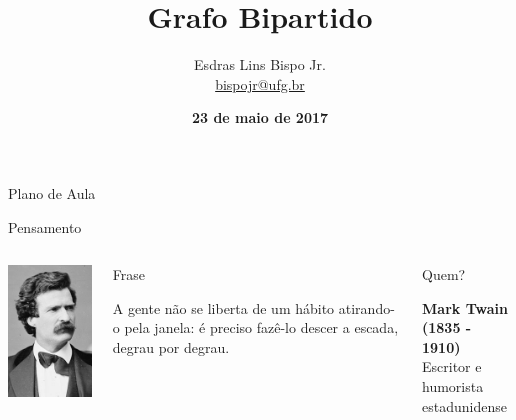 \documentclass[xcolor=dvipsnames,table]{beamer}
\title{Grafo Bipartido}
\author{
  Esdras Lins Bispo Jr. \\ \url{bispojr@ufg.br}
  }
\institute{
  Teoria de Grafos \\Bacharelado em Ciência da Computação}
\date{\textbf{23 de maio de 2017} }
\begin{document}
	\begin{frame}
		\titlepage
	\end{frame}

	\AtBeginSection{
		\begin{frame}{Sumário}%
    		\tableofcontents[currentsection]
		\end{frame}
	}

	\begin{frame}{Plano de Aula}
		\tableofcontents
	\end{frame}
    
    \begin{frame}{Pensamento}
		\begin{columns}
		  		\begin{center}
		    		\includegraphics[height=.8\textheight]{images/mark.jpg}
		  		\end{center}
				\begin{block}{Frase}
					\begin{center}
						{\large A gente não se liberta de um hábito atirando-o pela janela: é preciso fazê-lo descer a escada, degrau por degrau.}
					\end{center}
				\end{block}		  		
		  		\begin{block}{Quem?}
		  			\begin{center}
						{\bf Mark Twain (1835 - 1910)} \\Escritor e humorista estadunidense
					\end{center}
				\end{block}
		\end{columns}
	\end{frame}
    
\end{document}

